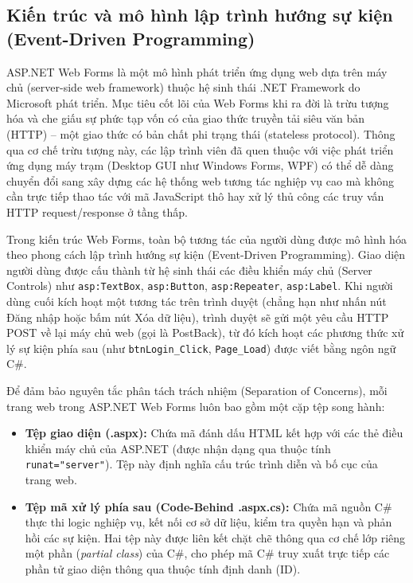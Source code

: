 \documentclass[12pt,a4paper]{report}
\begin{document}
\subsection{Kiến trúc và mô hình lập trình hướng sự kiện (Event-Driven Programming)}
ASP.NET Web Forms là một mô hình phát triển ứng dụng web dựa trên máy chủ (server-side web framework) thuộc hệ sinh thái .NET Framework do Microsoft phát triển. Mục tiêu cốt lõi của Web Forms khi ra đời là trừu tượng hóa và che giấu sự phức tạp vốn có của giao thức truyền tải siêu văn bản (HTTP) -- một giao thức có bản chất phi trạng thái (stateless protocol). Thông qua cơ chế trừu tượng này, các lập trình viên đã quen thuộc với việc phát triển ứng dụng máy trạm (Desktop GUI như Windows Forms, WPF) có thể dễ dàng chuyển đổi sang xây dựng các hệ thống web tương tác nghiệp vụ cao mà không cần trực tiếp thao tác với mã JavaScript thô hay xử lý thủ công các truy vấn HTTP request/response ở tầng thấp.

Trong kiến trúc Web Forms, toàn bộ tương tác của người dùng được mô hình hóa theo phong cách lập trình hướng sự kiện (Event-Driven Programming). Giao diện người dùng được cấu thành từ hệ sinh thái các điều khiển máy chủ (Server Controls) như \texttt{asp:TextBox}, \texttt{asp:Button}, \texttt{asp:Repeater}, \texttt{asp:Label}. Khi người dùng cuối kích hoạt một tương tác trên trình duyệt (chẳng hạn như nhấn nút Đăng nhập hoặc bấm nút Xóa dữ liệu), trình duyệt sẽ gửi một yêu cầu HTTP POST về lại máy chủ web (gọi là PostBack), từ đó kích hoạt các phương thức xử lý sự kiện phía sau (như \texttt{btnLogin\_Click}, \texttt{Page\_Load}) được viết bằng ngôn ngữ C\#.

Để đảm bảo nguyên tắc phân tách trách nhiệm (Separation of Concerns), mỗi trang web trong ASP.NET Web Forms luôn bao gồm một cặp tệp song hành:
\begin{itemize}
    \item \textbf{Tệp giao diện (.aspx):} Chứa mã đánh dấu HTML kết hợp với các thẻ điều khiển máy chủ của ASP.NET (được nhận dạng qua thuộc tính \texttt{runat="server"}). Tệp này định nghĩa cấu trúc trình diễn và bố cục của trang web.
    \item \textbf{Tệp mã xử lý phía sau (Code-Behind .aspx.cs):} Chứa mã nguồn C\# thực thi logic nghiệp vụ, kết nối cơ sở dữ liệu, kiểm tra quyền hạn và phản hồi các sự kiện. Hai tệp này được liên kết chặt chẽ thông qua cơ chế lớp riêng một phần (\textit{partial class}) của C\#, cho phép mã C\# truy xuất trực tiếp các phần tử giao diện thông qua thuộc tính định danh (ID).
\end{itemize}
\end{document}
